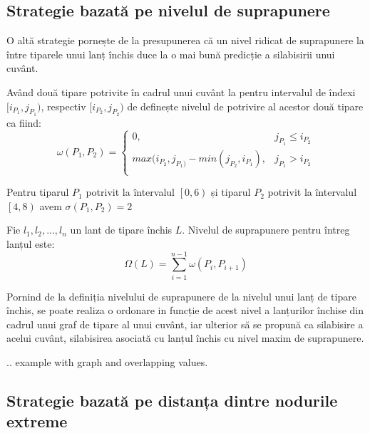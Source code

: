 \subsection{Strategie bazată pe nivelul de suprapunere}

O altă strategie pornește de la presupunerea că un nivel ridicat de suprapunere la între tiparele unui lanț închis duce la o mai bună predicție a silabisirii unui cuvânt.

\begin{defi}
Având două tipare potrivite în cadrul unui cuvânt la pentru intervalul de îndexi $[i_{P_1}, j_{P_1})$, respectiv $[i_{P_2}, j_{P_2})$ de definește nivelul de potrivire al acestor două tipare ca fiind:
\begin{equation}
\omega(P_1, P_2) = \left\{
\begin{matrix}
0, 					& j_{P_1} \leq i_{P_2}\\ 
max(i_{P_2},j_{P_1)} - min(j_{P_2},i_{P_1}),	& j_{P_1} > i_{P_2} \\
\end{matrix}
\right.
\end{equation}
\end{defi}

\begin{ex}
Pentru tiparul $P_1$ potrivit la întervalul $\left[0, 6\right)$ și tiparul $P_2$ potrivit la întervalul $\left[4, 8\right)$ avem $ \sigma(P_1,P_2)=2$
\end{ex}

\begin{defi}
Fie $l_1, l_2, ..., l_n$ un lant de tipare închis $L$. Nivelul de suprapunere pentru întreg lanțul este:
\begin{equation}
\Omega(L) = \sum_{i=1}^{n-1}{ \omega(P_i, P_{i+1})}
\end{equation}
\end{defi}

Pornind de la definiția nivelului de suprapunere de la nivelul unui lanț de tipare închis, se poate realiza o ordonare in funcție de acest nivel a lanțurilor închise din cadrul unui graf de tipare al unui cuvânt, iar ulterior să se propună ca silabisire a acelui cuvânt, silabisirea asociată cu lanțul închis cu nivel maxim de suprapunere.

\begin{ex}
.. example with graph and overlapping values.
\end{ex}

\subsection{Strategie bazată pe distanța dintre nodurile extreme}

